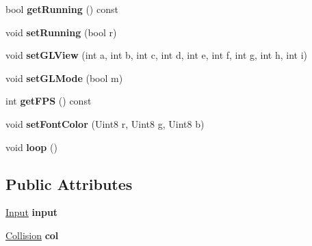 \begin{DoxyCompactItemize}
\item 
bool {\bfseries get\+Running} () const \hypertarget{classEngine_a8261a8bc23adeaf5a17a1d6301223eda}{}\label{classEngine_a8261a8bc23adeaf5a17a1d6301223eda}

\item 
void {\bfseries set\+Running} (bool r)\hypertarget{classEngine_ac5a84be825afebf377e227bcb049a753}{}\label{classEngine_ac5a84be825afebf377e227bcb049a753}

\item 
void {\bfseries set\+G\+L\+View} (int a, int b, int c, int d, int e, int f, int g, int h, int i)\hypertarget{classEngine_ad5387289f39246870a3c40d61b31fed8}{}\label{classEngine_ad5387289f39246870a3c40d61b31fed8}

\item 
void {\bfseries set\+G\+L\+Mode} (bool m)\hypertarget{classEngine_a0ac77a2abc0269f3825a184fbfcef3dd}{}\label{classEngine_a0ac77a2abc0269f3825a184fbfcef3dd}

\item 
int {\bfseries get\+F\+PS} () const \hypertarget{classEngine_a7b4d5a0722d470402278c05fed39c1f1}{}\label{classEngine_a7b4d5a0722d470402278c05fed39c1f1}

\item 
void {\bfseries set\+Font\+Color} (Uint8 r, Uint8 g, Uint8 b)\hypertarget{classEngine_a3658606ab22302767e81ab6d1975d6bd}{}\label{classEngine_a3658606ab22302767e81ab6d1975d6bd}

\item 
void {\bfseries loop} ()\hypertarget{classEngine_a514f8d788ced7c6508b8b6f9ef66ccb1}{}\label{classEngine_a514f8d788ced7c6508b8b6f9ef66ccb1}

\end{DoxyCompactItemize}
\subsection*{Public Attributes}
\begin{DoxyCompactItemize}
\item 
\hyperlink{classInput}{Input} {\bfseries input}\hypertarget{classEngine_aea9ed2f40335370849a96b262731fc0a}{}\label{classEngine_aea9ed2f40335370849a96b262731fc0a}

\item 
\hyperlink{classCollision}{Collision} {\bfseries col}\hypertarget{classEngine_a2ced09f61316f08f0268c35beb0b9218}{}\label{classEngine_a2ced09f61316f08f0268c35beb0b9218}

\end{DoxyCompactItemize}


